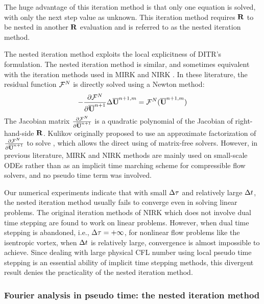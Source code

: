 \documentclass[preprint,12pt]{elsarticle}
\begin{document}
The huge advantage of this iteration method is that only one equation is solved,
with only the next step value as unknown.
This iteration method requires $\mathbf{R}$ to be nested in another $\mathbf{R}$ evaluation and
is referred to as the nested iteration method.

The nested iteration method exploits the
local explicitness of DITR's formulation.
The nested iteration method is similar, and sometimes equivalent with
the iteration methods used in MIRK \cite{cash1975classMIRKOrig,cash1977clasMIRK1,cash1982monoMIRK2}
and NIRK \cite{kulikov2006familyNIRKOrig,kulikov2009adaptive,kulikov2007asymptotic}.
In these literature, the residual function $\mathcal{F}^N$ is directly
solved using a Newton method:
\begin{equation}
    -\partialderivative{\FF^N}{\uu^{n+1}}
    \inc\uu^{n+1,m} = \FF^N(\uu^{n+1,m})
    \label{eq:abstractNewtonNestedNoTau}
\end{equation}
The Jacobian matrix $\partialderivative{\FF^N}{\uu^{n+1}}$
is a quadratic polynomial of the Jacobian of right-hand-side $\mathbf{R}$.
Kulikov originally proposed to use an approximate factorization \cite{kulikov2006familyNIRKOrig}
of $\partialderivative{\FF^N}{\uu^{n+1}}$ to solve ,
which allows the direct using of matrix-free solvers.
However, in previous literature, MIRK and NIRK methods are mainly used on small-scale 
ODEs rather than as an implicit time marching scheme for compressible flow solvers, 
and no pseudo time term was involved.

Our numerical experiments indicate that with small $\mathrm\Delta\tau$
and relatively large $\mathrm\Delta t$,
the nested iteration method  
usually fails to converge even in solving linear problems.
The original iteration methods of NIRK 
which does not involve dual time stepping 
are found to work on linear problems.  
However,  when dual time stepping is abandoned, i.e., $\mathrm\Delta \tau=+\infty$,
for nonlinear flow problems like the isentropic vortex, 
 when $\mathrm\Delta t$ is relatively large, convergence is almost impossible 
 to achieve.
Since dealing with large physical CFL number using local
pseudo time stepping is an essential ability of implicit
time stepping methods,
this divergent result denies the practicality of the
nested iteration method.






\subsubsection{Fourier analysis in pseudo time: the nested iteration method}
\end{document}
